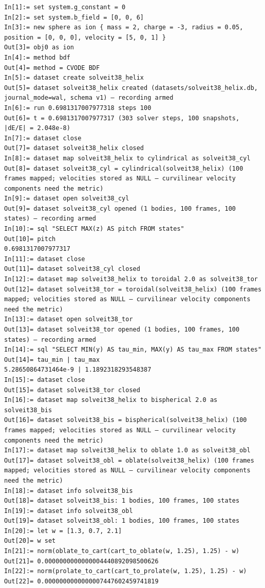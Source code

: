 \documentclass[11pt]{article}
\begin{document}
\begin{lstlisting}
In[1]:= set system.g_constant = 0
In[2]:= set system.b_field = [0, 0, 6]
In[3]:= new sphere as ion { mass = 2, charge = -3, radius = 0.05, position = [0, 0, 0], velocity = [5, 0, 1] }
Out[3]= obj0 as ion
In[4]:= method bdf
Out[4]= method = CVODE BDF
In[5]:= dataset create solveit38_helix
Out[5]= dataset solveit38_helix created (datasets/solveit38_helix.db, journal_mode=wal, schema v1) — recording armed
In[6]:= run 0.6981317007977318 steps 100
Out[6]= t = 0.6981317007977317 (303 solver steps, 100 snapshots, |dE/E| = 2.048e-8)
In[7]:= dataset close
Out[7]= dataset solveit38_helix closed
In[8]:= dataset map solveit38_helix to cylindrical as solveit38_cyl
Out[8]= dataset solveit38_cyl = cylindrical(solveit38_helix) (100 frames mapped; velocities stored as NULL — curvilinear velocity components need the metric)
In[9]:= dataset open solveit38_cyl
Out[9]= dataset solveit38_cyl opened (1 bodies, 100 frames, 100 states) — recording armed
In[10]:= sql "SELECT MAX(z) AS pitch FROM states"
Out[10]= pitch
0.6981317007977317
In[11]:= dataset close
Out[11]= dataset solveit38_cyl closed
In[12]:= dataset map solveit38_helix to toroidal 2.0 as solveit38_tor
Out[12]= dataset solveit38_tor = toroidal(solveit38_helix) (100 frames mapped; velocities stored as NULL — curvilinear velocity components need the metric)
In[13]:= dataset open solveit38_tor
Out[13]= dataset solveit38_tor opened (1 bodies, 100 frames, 100 states) — recording armed
In[14]:= sql "SELECT MIN(y) AS tau_min, MAX(y) AS tau_max FROM states"
Out[14]= tau_min | tau_max
5.28650864731464e-9 | 1.1892318293548387
In[15]:= dataset close
Out[15]= dataset solveit38_tor closed
In[16]:= dataset map solveit38_helix to bispherical 2.0 as solveit38_bis
Out[16]= dataset solveit38_bis = bispherical(solveit38_helix) (100 frames mapped; velocities stored as NULL — curvilinear velocity components need the metric)
In[17]:= dataset map solveit38_helix to oblate 1.0 as solveit38_obl
Out[17]= dataset solveit38_obl = oblate(solveit38_helix) (100 frames mapped; velocities stored as NULL — curvilinear velocity components need the metric)
In[18]:= dataset info solveit38_bis
Out[18]= dataset solveit38_bis: 1 bodies, 100 frames, 100 states
In[19]:= dataset info solveit38_obl
Out[19]= dataset solveit38_obl: 1 bodies, 100 frames, 100 states
In[20]:= let w = [1.3, 0.7, 2.1]
Out[20]= w set
In[21]:= norm(oblate_to_cart(cart_to_oblate(w, 1.25), 1.25) - w)
Out[21]= 0.0000000000000004440892098500626
In[22]:= norm(prolate_to_cart(cart_to_prolate(w, 1.25), 1.25) - w)
Out[22]= 0.0000000000000007447602459741819

\end{lstlisting}
\end{document}

